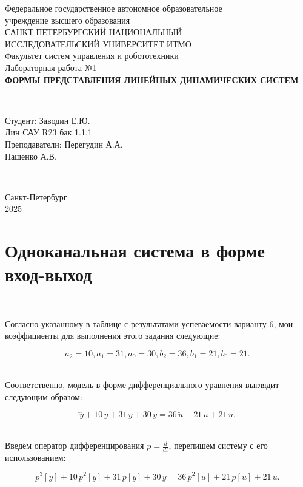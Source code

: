 \documentclass[a4paper]{article}
\begin{document}
\begin{titlepage}
    \begin{center}
        Федеральное государственное автономное образовательное \\ учреждение высшего образования \\[6pt]
        САНКТ-ПЕТЕРБУРГСКИЙ НАЦИОНАЛЬНЫЙ \\ ИССЛЕДОВАТЕЛЬСКИЙ УНИВЕРСИТЕТ ИТМО \\[16pt]
        Факультет систем управления и робототехники \\[26em]
        Лабораторная работа №1\\[0.5em]
        \textbf{ФОРМЫ ПРЕДСТАВЛЕНИЯ ЛИНЕЙНЫХ ДИНАМИЧЕСКИХ СИСТЕМ}
    \end{center}\,\\[10em]
    \begin{flushright}
        Студент: Заводин Е.Ю.\\
        Лин САУ R23 бак 1.1.1 \\[0.5em]
        Преподаватели: Перегудин А.А.\\
        Пашенко А.В.
    \end{flushright}\,\\[6em]
    \begin{center}
        {\small Санкт-Петербург \\ 2025}
    \end{center}
\end{titlepage}
\setcounter{page}{2}
\tableofcontents\newpage

\section{Одноканальная система в форме вход-выход}\

Согласно указанному в таблице с результатами успеваемости варианту 6, мои коэффициенты для выполнения этого задания следующие:\

$$
a_2 = 10, a_1 = 31, a_0 = 30, b_2 = 36, b_1 = 21, b_0 = 21.
$$\

Соответственно, модель в форме дифференциального уравнения выглядит следующим образом:\

$$
\dddot{y}+10\,\ddot{y}+31\,\dot{y} + 30\,y = 36\,\ddot{u} + 21\,\dot{u} + 21\,u.
$$\

Введём оператор дифференцирования $p = \frac{d}{dt}$, перепишем систему с его использованием:\

$$
p^3[y]+10\,p^2[y]+31\,p[y] + 30\,y = 36\,p^2[u] + 21\,p[u] + 21\,u.
$$\
\end{document}
